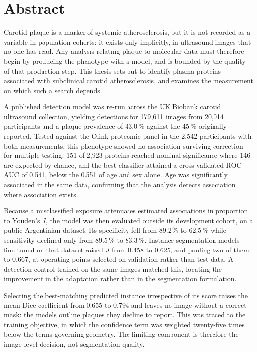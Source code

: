 \chapter*{Abstract}

Carotid plaque is a marker of systemic atherosclerosis, but it is not recorded as a variable in
population cohorts: it exists only implicitly, in ultrasound images that no one has read. Any
analysis relating plaque to molecular data must therefore begin by producing the phenotype with a
model, and is bounded by the quality of that production step. This thesis sets out to identify
plasma proteins associated with subclinical carotid atherosclerosis, and examines the measurement
on which such a search depends.

A published detection model was re-run across the UK Biobank carotid ultrasound collection,
yielding detections for 179{,}611 images from 20{,}014 participants and a plaque prevalence of
43.0\,\% against the 45\,\% originally reported. Tested against the Olink proteomic panel in the
2{,}542 participants with both measurements, this phenotype showed no association surviving
correction for multiple testing: 151 of 2{,}923 proteins reached nominal significance where 146
are expected by chance, and the best classifier attained a cross-validated ROC-AUC of 0.541,
below the 0.551 of age and sex alone. Age was significantly associated in the same data,
confirming that the analysis detects association where association exists.

Because a misclassified exposure attenuates estimated associations in proportion to Youden's $J$,
the model was then evaluated outside its development cohort, on a public Argentinian dataset. Its
specificity fell from 89.2\,\% to 62.5\,\% while sensitivity declined only from 89.5\,\% to
83.3\,\%. Instance segmentation models fine-tuned on that dataset raised $J$ from 0.458 to 0.625,
and pooling two of them to 0.667, at operating points selected on validation rather than test
data. A detection control trained on the same images matched this, locating the improvement in
the adaptation rather than in the segmentation formulation.

Selecting the best-matching predicted instance irrespective of its score raises the mean Dice
coefficient from 0.655 to 0.794 and leaves no image without a correct mask: the models outline
plaques they decline to report. This was traced to the training objective, in which the
confidence term was weighted twenty-five times below the terms governing geometry. The limiting
component is therefore the image-level decision, not segmentation quality.
